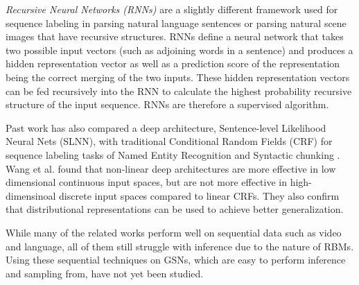 \emph{Recursive Neural Networks (RNNs)} \cite{socher11} are a slightly different framework used for sequence labeling in parsing natural language sentences or parsing natural scene images that have recursive structures. RNNs define a neural network that takes two possible input vectors (such as adjoining words in a sentence) and produces a hidden representation vector as well as a prediction score of the representation being the correct merging of the two inputs. These hidden representation vectors can be fed recursively into the RNN to calculate the highest probability recursive structure of the input sequence. RNNs are therefore a supervised algorithm.

Past work has also compared a deep architecture, Sentence-level Likelihood Neural Nets (SLNN), with traditional Conditional Random Fields (CRF) for sequence labeling tasks of Named Entity Recognition and Syntactic chunking \cite{wang13}. Wang et al. found that non-linear deep architectures are more effective in low dimensional continuous input spaces, but are not more effective in high-dimensinoal discrete input spaces compared to linear CRFs. They also confirm that distributional representations can be used to achieve better generalization.

While many of the related works perform well on sequential data such as video and language, all of them still struggle with inference due to the nature of RBMs. Using these sequential techniques on GSNs, which are easy to perform inference and sampling from, have not yet been studied.